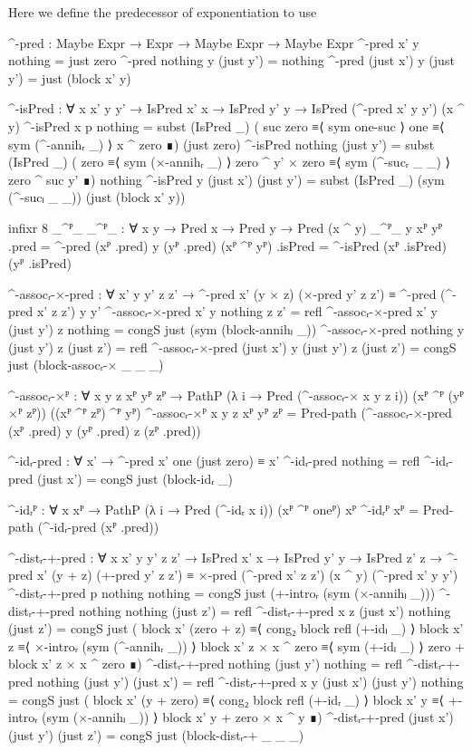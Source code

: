 Here we define the predecessor of exponentiation to use 
\begin{code}
  ^-pred : Maybe Expr → Expr → Maybe Expr → Maybe Expr
  ^-pred x' y nothing = just zero
  ^-pred nothing y (just y') = nothing
  ^-pred (just x') y (just y') = just (block x' y)
\end{code}
\begin{code}[hide]
  ^-isPred :
    ∀ {x x' y y'} →
    IsPred x' x → IsPred y' y → IsPred (^-pred x' y y') (x ^ y)
  ^-isPred {x} p nothing =
    subst (IsPred _)
      ( suc zero ≡⟨ sym one-suc ⟩
        one      ≡⟨ sym (^-annihᵣ _) ⟩
        x ^ zero ∎)
      (just zero)
  ^-isPred nothing (just y') =
    subst (IsPred _)
      ( zero              ≡⟨ sym (×-annihᵣ _) ⟩
        zero ^ y' × zero ≡⟨ sym (^-sucᵣ _ _) ⟩
        zero ^ suc y'    ∎)
      nothing
  ^-isPred {y} (just x') (just y') =
    subst (IsPred _) (sym (^-sucₗ _ _)) (just (block x' y))

  infixr 8 _^ᴾ_
  _^ᴾ_ : ∀ {x y} → Pred x → Pred y → Pred (x ^ y)
  _^ᴾ_ {y} xᴾ yᴾ .pred = ^-pred (xᴾ .pred) y (yᴾ .pred)
  (xᴾ ^ᴾ yᴾ) .isPred = ^-isPred (xᴾ .isPred) (yᴾ .isPred)

  ^-assocᵣ-×-pred :
    ∀ x' y y' z z' →
    ^-pred x' (y × z) (×-pred y' z z') ≡ ^-pred (^-pred x' z z') y y'
  ^-assocᵣ-×-pred x' y nothing z z' = refl
  ^-assocᵣ-×-pred x' y (just y') z nothing = congS just (sym (block-annihₗ _))
  ^-assocᵣ-×-pred nothing y (just y') z (just z') = refl
  ^-assocᵣ-×-pred (just x') y (just y') z (just z') =
    congS just (block-assocᵣ-× _ _ _)

  ^-assocᵣ-×ᴾ :
    ∀ {x y z} xᴾ yᴾ zᴾ →
    PathP (λ i → Pred (^-assocᵣ-× x y z i))
      (xᴾ ^ᴾ (yᴾ ×ᴾ zᴾ)) ((xᴾ ^ᴾ zᴾ) ^ᴾ yᴾ)
  ^-assocᵣ-×ᴾ {x} {y} {z} xᴾ yᴾ zᴾ =
    Pred-path (^-assocᵣ-×-pred (xᴾ .pred) y (yᴾ .pred) z (zᴾ .pred))

  ^-idᵣ-pred : ∀ x' → ^-pred x' one (just zero) ≡ x'
  ^-idᵣ-pred nothing = refl
  ^-idᵣ-pred (just x') = congS just (block-idᵣ _)

  ^-idᵣᴾ : ∀ {x} xᴾ → PathP (λ i → Pred (^-idᵣ x i)) (xᴾ ^ᴾ oneᴾ) xᴾ
  ^-idᵣᴾ xᴾ = Pred-path (^-idᵣ-pred (xᴾ .pred))

  ^-distᵣ-+-pred :
    ∀ {x x' y y' z z'} → IsPred x' x → IsPred y' y → IsPred z' z →
    ^-pred x' (y + z) (+-pred y' z z') ≡
    ×-pred (^-pred x' z z') (x ^ y) (^-pred x' y y')
  ^-distᵣ-+-pred p nothing nothing =
    congS just (+-introᵣ (sym (×-annihₗ _)))
  ^-distᵣ-+-pred nothing nothing (just z') = refl
  ^-distᵣ-+-pred {x} {z} (just x') nothing (just z') =
    congS just
      ( block x' (zero + z)          ≡⟨ cong₂ block refl (+-idₗ _) ⟩
        block x' z                   ≡⟨ ×-introᵣ (sym (^-annihᵣ _)) ⟩
        block x' z × x ^ zero        ≡⟨ sym (+-idₗ _) ⟩
        zero + block x' z × x ^ zero ∎)
  ^-distᵣ-+-pred nothing (just y') nothing = refl
  ^-distᵣ-+-pred nothing (just y') (just x') = refl
  ^-distᵣ-+-pred {x} {y} (just x') (just y') nothing =
    congS just
      ( block x' (y + zero)       ≡⟨ cong₂ block refl (+-idᵣ _) ⟩
        block x' y                ≡⟨ +-introᵣ (sym (×-annihₗ _)) ⟩
        block x' y + zero × x ^ y ∎)
  ^-distᵣ-+-pred (just x') (just y') (just z') =
    congS just (block-distᵣ-+ _ _ _)


\end{code}
